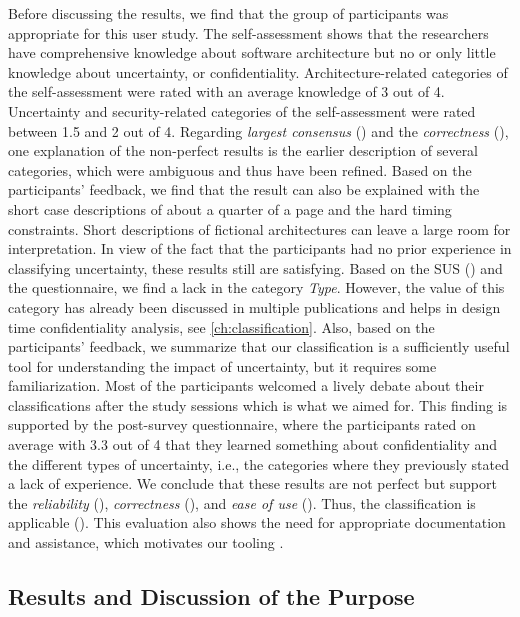 Before discussing the results, we find that the group of participants was appropriate for this user study.
The self-assessment shows that the researchers have comprehensive knowledge about software architecture but no or only little knowledge about uncertainty, or confidentiality.
Architecture-related categories of the self-assessment were rated with an average knowledge of 3 out of 4.
Uncertainty and security-related categories of the self-assessment were rated between 1.5 and 2 out of 4.
Regarding \emph{largest consensus} () and the \emph{correctness} (), one explanation of the non-perfect results is the earlier description of several categories, which were ambiguous and thus have been refined.
Based on the participants' feedback, we find that the result can also be explained with the short case descriptions of about a quarter of a page and the hard timing constraints.
Short descriptions of fictional architectures can leave a large room for interpretation.
In view of the fact that the participants had no prior experience in classifying uncertainty, these results still are satisfying.
Based on the \ac{SUS} () and the questionnaire, we find a lack in the category \emph{Type}.
However, the value of this category has already been discussed in multiple publications \cite{mahdavi-hezavehi_classification_2017,walker_defining_2003} and helps in design time confidentiality analysis, see \autoref{ch:classification}.
Also, based on the participants' feedback, we summarize that our classification is a sufficiently useful tool for understanding the impact of uncertainty, but it requires some familiarization.
Most of the participants welcomed a lively debate about their classifications after the study sessions which is what we aimed for.
This finding is supported by the post-survey questionnaire, where the participants rated on average with 3.3 out of 4 that they learned something about confidentiality and the different types of uncertainty, i.e., the categories where they previously stated a lack of experience.
We conclude that these results are not perfect but support the \emph{reliability} (), \emph{correctness} (), and \emph{ease of use} ().
Thus, the classification is applicable ().
This evaluation also shows the need for appropriate documentation and assistance, which motivates our tooling \arcen.


\subsection{Results and Discussion of the Purpose}

